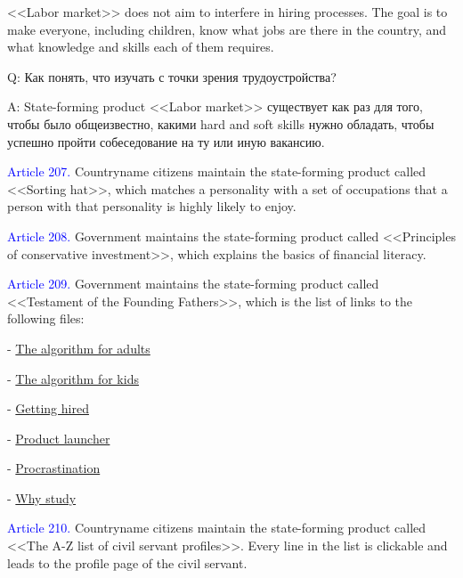 \documentclass[11pt]{article}
\theoremstyle{remark}
\theoremstyle{definition}
\begin{document}
<<Labor market>> does not aim to interfere in hiring processes. The goal is to make everyone, including children, know what jobs are there in the country, and what knowledge and skills each of them requires.



Q: Как понять, что изучать с точки зрения трудоустройства?

A: State-forming product <<Labor market>> существует как раз для того, чтобы было общеизвестно, какими hard and soft skills нужно обладать, чтобы успешно пройти собеседование на ту или иную вакансию.



\color{black}


\textcolor{blue}{Article 207.} Countryname citizens maintain the state-forming product called <<Sorting hat>>, which matches a personality with a set of occupations that a person with that personality is highly likely to enjoy.


\color{blue}





\color{black}


\textcolor{blue}{Article 208.} Government maintains the state-forming product called <<Principles of conservative investment>>, which explains the basics of financial literacy. 

\textcolor{blue}{Article 209.} Government maintains the state-forming product called <<Testament of the Founding Fathers>>, which is the list of links to the following files:


- \href{https://garkoosha.org/misc/alg_for_adults.pdf}{The algorithm for adults}

- \href{https://garkoosha.org/misc/alg_for_kids.pdf}{The algorithm for kids}

- \href{https://garkoosha.org/misc/getting_hired.pdf}{Getting hired}

- \href{https://garkoosha.org/misc/product_launcher.pdf}{Product launcher}

- \href{https://garkoosha.org/misc/procrastination.pdf}{Procrastination}

- \href{https://garkoosha.org/misc/why_study.pdf}{Why study}






\textcolor{blue}{Article 210.} Countryname citizens maintain the state-forming product called <<The A-Z list of civil servant profiles>>. Every line in the list is clickable and leads to the profile page of the civil servant.
\end{document}
